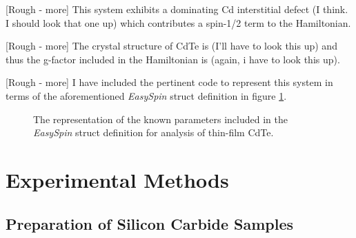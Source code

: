 \documentclass[oneside, astronomy, noacknowlegments]{BYUPhys}
\begin{document}
[Rough - more] This system exhibits a dominating Cd interstitial defect (I think. I should look that one up) which contributes a spin-1/2 term to the Hamiltonian.

[Rough - more] The crystal structure of CdTe is (I'll have to look this up) and thus the g-factor included in the Hamiltonian is (again, i have to look this up).

[Rough - more] I have included the pertinent code to represent this system in terms of the aforementioned \textit{EasySpin} struct definition in figure \ref{fig:CdTeParams}.

\begin{figure}
    \caption[The \textit{EasySpin} representation of CdTe]{\label{fig:CdTeParams}
     The representation of the known parameters included in the \textit{EasySpin} struct definition for analysis of thin-film CdTe.}
 \end{figure}
 










\chapter{Experimental Methods}

\section{Preparation of Silicon Carbide Samples}
\label{sec:SiCSamples}
\end{document}
